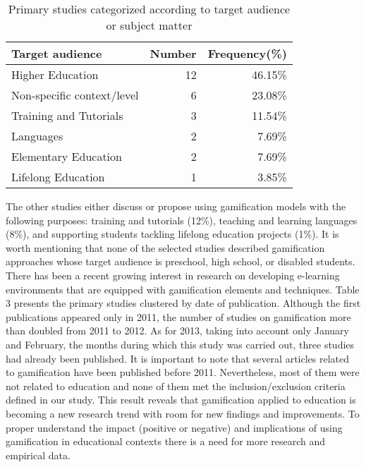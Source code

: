 \begin{table}[]
\centering
\caption{Primary studies categorized according to target
audience or subject matter}
\label{tab:target_audience}
\begin{tabular}{|l|r|r|}
\hline
\textbf{Target audience}   & \multicolumn{1}{l|}{\textbf{Number}} & \multicolumn{1}{l|}{\textbf{Frequency(\%)}} \\ \hline
Higher Education           & 12                                   & 46.15\%                                     \\ \hline
Non-specific context/level & 6                                    & 23.08\%                                     \\ \hline
Training and Tutorials     & 3                                    & 11.54\%                                     \\ \hline
Languages                  & 2                                    & 7.69\%                                      \\ \hline
Elementary Education       & 2                                    & 7.69\%                                      \\ \hline
Lifelong Education         & 1                                    & 3.85\%                                      \\ \hline
\end{tabular}
\end{table}

The other studies either discuss or propose using gamification
models with the following purposes: training and tutorials (12\%),
teaching and learning languages (8\%), and supporting students
tackling lifelong education 
 projects (1\%). It is worth mentioning that none of the selected studies described gamification approaches whose target audience is preschool, high school, or disabled
students.
There has been a recent growing interest in research on developing
e-learning environments that are equipped with gamification
elements and techniques. Table 3 presents the primary studies
clustered by date of publication. Although the first publications
appeared only in 2011, the number of studies on gamification more
than doubled from 2011 to 2012. As for 2013, taking into account
only January and February, the months during which this study was
carried out, three studies had already been published. It is important
to note that several articles related to gamification have been
published before 2011. Nevertheless, most of them were not related
to education and none of them met the inclusion/exclusion criteria
defined in our study. This result reveals that gamification applied
to education is becoming a new research trend with room for new
findings and improvements. To proper understand the impact
(positive or negative) and implications of using gamification in
educational contexts there is a need for more research and empirical
data. 

